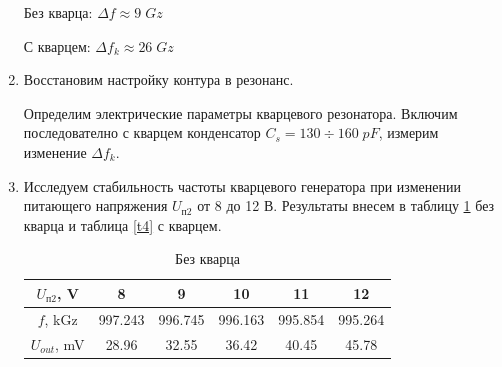 \documentclass[a4paper]{article}
\begin{document}
\begin{enumerate}
    \begin{center}
        Без кварца: $\Delta f \approx 9\; Gz$ \par 
        С кварцем: $\Delta f_k \approx 26\; Gz$
    \end{center}

    \begin{center}
    \end{center}



    \item Восстановим настройку контура в резонанс.  \par 
    
    Определим электрические параметры кварцевого резонатора. Включим последователно с кварцем конденсатор $C_s = 130 \div 160\; pF$, измерим изменение $\Delta f_k$.

    \begin{center}
         \par 
         \par 
         \par 
    \end{center}

    \item Исследуем стабильность частоты кварцевого генератора при изменении питающего напряжения $U_{п2}$ от 8 до 12 В. Результаты внесем в таблицу \ref{t3} без кварца и таблица \ref{t4} с кварцем.
    
    \begin{table}[H]
        \centering
        \begin{center}
        \end{center}
        \vspace{0.1cm}
        \begin{tabular}{|c|c|c|c|c|c|}
            \hline
            $U_{п2}$, V & 8&9&10&11&12 \\ 
            \hline
            $f$, kGz  &997.243&  996.745& 996.163& 995.854& 995.264 \\ 
            \hline
            $U_{out}$, mV &28.96&32.55&36.42 &40.45&45.78 \\
            \hline
            \end{tabular}
            \caption{Без кварца}
            \label{t3}
    \end{table}


\end{enumerate}
\end{document}

